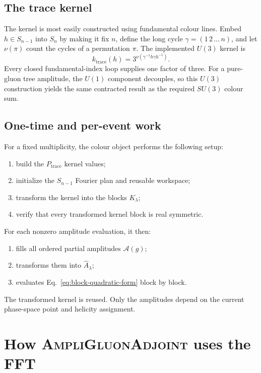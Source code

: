 \documentclass[11pt,a4paper]{article}
\newcommand{\cA}{\mathcal{A}}
\begin{document}
\subsection{The trace kernel}

The kernel is most easily constructed using fundamental colour lines.  Embed
$h\in S_{n-1}$ into $S_n$ by making it fix $n$, define the long cycle
$\gamma=(1\,2\,\ldots\,n)$, and let $\nu(\pi)$ count the cycles of a
permutation $\pi$.  The implemented $U(3)$ kernel is
\begin{equation}
  k_{\mathrm{trace}}(h)
  =3^{\nu(\gamma^{-1}h\gamma h^{-1})}.
  \label{eq:trace-loop-kernel}
\end{equation}
Every closed fundamental-index loop supplies one factor of three.  For a
pure-gluon tree amplitude, the $U(1)$ component decouples, so this $U(3)$
construction yields the same contracted result as the required $SU(3)$
colour sum.

\subsection{One-time and per-event work}

For a fixed multiplicity, the colour object performs the following setup:
\begin{enumerate}
  \item build the $P_{\mathrm{trace}}$ kernel values;
  \item initialize the $S_{n-1}$ Fourier plan and reusable workspace;
  \item transform the kernel into the blocks $K_\lambda$;
  \item verify that every transformed kernel block is real symmetric.
\end{enumerate}
For each nonzero amplitude evaluation, it then:
\begin{enumerate}
  \item fills all ordered partial amplitudes $\cA(g)$;
  \item transforms them into $\widehat A_\lambda$;
  \item evaluates Eq.~\eqref{eq:block-quadratic-form} block by block.
\end{enumerate}
The transformed kernel is reused.  Only the amplitudes depend on the current
phase-space point and helicity assignment.

\section{How \textsc{AmpliGluonAdjoint} uses the FFT}
\end{document}
